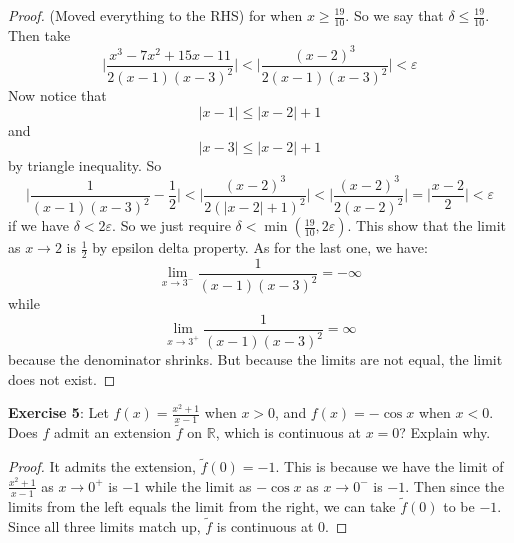 \documentclass{article}
\begin{document}
\begin{proof}
        (Moved everything to the RHS) for when $x \geq \frac{19}{10}$. So we say that $\delta \leq\frac{19}{10}$. Then take 
            \begin{equation*}
                \lvert \dfrac{x^{3} - 7x^{2} + 15x - 11}{2(x - 1)(x - 3)^{2}} \rvert < \lvert \dfrac{(x - 2)^{3}}{2(x - 1)(x - 3)^{2}} \rvert < \varepsilon
            \end{equation*}
        Now notice that
            \begin{equation*}
                \lvert x - 1 \rvert \leq \lvert x - 2 \rvert + 1
            \end{equation*}
        and
            \begin{equation*}
                \lvert x - 3 \rvert \leq \lvert x - 2 \rvert + 1
            \end{equation*}
        by triangle inequality. So
            \begin{equation*}
                \lvert \dfrac{1}{(x - 1)(x - 3)^{2}} - \dfrac{1}{2} \rvert < \lvert \dfrac{(x - 2)^{3}}{2(\lvert x - 2 \rvert + 1)^{2}} \rvert < \lvert \dfrac{(x - 2)^{3}}{2(x - 2)^{2}} \rvert = \lvert \dfrac{x - 2}{2} \rvert < \varepsilon
            \end{equation*}
        if we have $\delta < 2\varepsilon$. So we just require $\delta < \min(\frac{19}{10}, 2\varepsilon)$. This show that the limit as $x \rightarrow 2$ is $\frac{1}{2}$ by epsilon delta property. As for the last one, we have:
            \begin{equation*}
                \lim\limits_{x \to 3^{-}}\dfrac{1}{(x - 1)(x - 3)^{2}} = -\infty
            \end{equation*}
        while 
            \begin{equation*}
                \lim\limits_{x \to 3^{+}}\dfrac{1}{(x - 1)(x - 3)^{2}} = \infty
            \end{equation*}
        because the denominator shrinks. But because the limits are not equal, the limit does not exist.
    \end{proof}

\textbf{Exercise 5}: Let $f(x) = \frac{x^{2} + 1}{x - 1}$ when $x > 0$, and $f(x) = -\cos{x}$ when $x < 0$. Does $f$ admit an extension $\tilde{f}$ on $\mathbb{R}$, which is continuous at $x = 0$? Explain why.
    \begin{proof}
        It admits the extension, $\tilde{f}(0) = -1$. This is because we have the limit of $\frac{x^{2} + 1}{x - 1}$ as $x \rightarrow 0^{+}$ is $-1$ while the limit as $-\cos{x}$ as $x \rightarrow 0^{-}$ is $-1$. Then since the limits from the left equals the limit from the right, we can take $\tilde{f}(0)$ to be $-1$. Since all three limits match up, $\tilde{f}$ is continuous at $0$.
    \end{proof}
\end{document}
